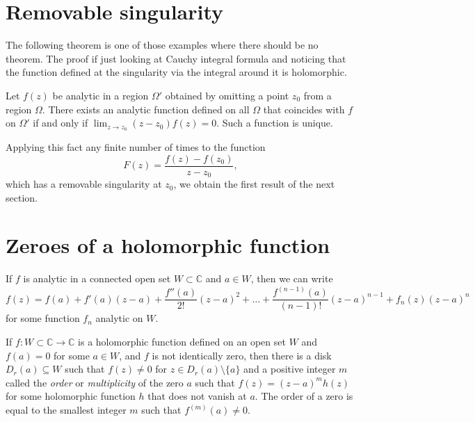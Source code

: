 \section{Removable singularity}
\label{section-removable-singularity}

The following theorem is one of those examples where there should be no theorem.
The proof if just looking at Cauchy integral formula and noticing that the
function defined at the singularity via the integral around it is holomorphic.

\begin{theorem}
\label{theorem-removable-singularity}
Let $f(z)$ be analytic in a region $\Omega'$ obtained by omitting a point $z_0$
from a region $\Omega$. There exists an analytic function  defined on all 
$\Omega$ that coincides with $f$ on $\Omega'$ if and only if 
$\lim_{z \to z_0} (z-z_0)f(z)=0$. Such a function is unique.
\end{theorem}

Applying this fact any finite number of times to the function
$$
F(z)=\frac{f(z)-f(z_0)}{z-z_0},
$$
which has a removable singularity at $z_0$, we obtain the first result of the 
next section.

\section{Zeroes of a holomorphic function}
\label{section-zeroes}

\begin{lemma}
\label{lemma-finite-Taylor-expansion}
If $f$ is analytic in a connected open set $W\subset\mathbb{C}$ and $a \in W$,
then we can write
$$
f(z)=f(a)+f'(a)(z-a)+\frac{f''(a)}{2!}(z-a)^2+\ldots
+\frac{f^{(n-1)}(a)}{(n-1)!}(z-a)^{n-1}+f_n(z)(z-a)^n
$$
for some function $f_n$ analytic on $W$.
\end{lemma}

\begin{theorem}
\label{theorem-zeroes-are-isolated-and-have-finite-order}
If $f:W\subset\mathbb{C}\to \mathbb{C}$ is a holomorphic function defined on an
open set $W$ and $f(a)=0$ for some $a\in W$, and $f$ is not identically zero,
then there is a disk $D_r(a)\subseteq W$ such that $f(z)\neq 0$ for $z \in
D_r(a)\setminus\{a\}$ and a positive integer $m$ called the {\it order} or
{\it multiplicity} of the zero $a$ such that  $f(z)=(z-a)^mh(z)$ for some
holomorphic function $h$ that does not vanish at $a$. The order of a zero is
equal to the smallest integer $m$ such that $f^{(m)}(a)\neq 0$.
\end{theorem}

